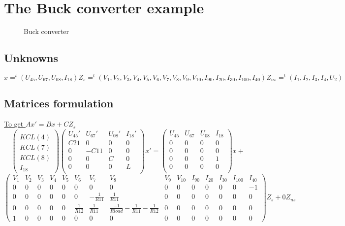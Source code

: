\section{The Buck converter example}
\begin{figure}[h]
\centerline{
 \scalebox{1.0}{
    
 }
}
\caption{Buck converter}
\label{fig-Buck-converter}
\end{figure}
\subsection{Unknowns}
$x=^{t}(U_{45},U_{67},U_{08},I_{18}) Z_{s}=^{t}(V_{1},V_{2},V_{3},V_{4},V_{5},V_{6},V_{7},V_{8},V_{9},V_{10},I_{90},I_{20},I_{30},I_{100},I_{40})
Z_{ns}=^{t}(I_{1},I_{2},I_{3},I_{4},U_{2})$\\
\subsection{Matrices formulation}
\underline{To get $Ax'= Bx+CZ_{s}$}
\[\left(\begin{array}{c}
  \\
KCL(4)\\KCL(7)\\KCL(8)\\I_{18}
\end{array}\right)
\left(\begin{array}{cccc}
  U_{45}'&U_{67}'&U_{08}'&I_{18}'\\
  \hline
  C21&0&0&0\\
  0&-C11&0&0\\
  0&0&C&0\\
  0&0&0&L\\  
\end{array}\right)x'=
\left(\begin{array}{cccc}
  U_{45}&U_{67}&U_{08}&I_{18}\\
  \hline
  0&0&0&0\\
  0&0&0&0\\
  0&0&0&1\\
  0&0&0&0\\
\end{array}\right)x+\]
\[
\left(\begin{array}{ccccccccccccccc}
  V_{1}&V_{2}&V_{3}&V_{4}&V_{5}&V_{6}&V_{7}&V_{8}&V_{9}&V_{10}&I_{90}&I_{20}&I_{30}&I_{100}&I_{40}\\
  \hline
  0&0&0&0&0&0&0&0&0&0&0&0&0&0&-1\\
  0&0&0&0&0&0&-\frac{1}{R11}&\frac{1}{R11}&0&0&0&0&0&0&0\\
  0&0&0&0&0&\frac{1}{R12}&\frac{1}{R11}&\frac{-1}{Rload}-\frac{1}{R11}-\frac{1}{R12}&0&0&0&0&0&0&0\\
  1&0&0&0&0&0&0&0&0&0&0&0&0&0&0
\end{array}\right)Z_{s}+0Z_{ns}\]
